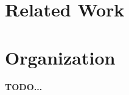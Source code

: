 \begin{comment}
A first application is mining. A miner is usually rewarded a fee after completing two tasks: verifying that the transactions in a new block are legitimate and completing a proof of work, usually in the form of finding a hash preimage of a string with a specific prefix. Other miners in turn invest computational resources verifying that these two tasks were accomplished correctly. This can be computationally intensive. If the checks miners usually carry out admitted non-interactive publicly verifiable rational proofs, they could simply verify those. This could lead  enormous savings in computational resources. Utility-maximizing blockchain users who are trying to arrive first mining a new block 
Some further observations are in place. The approach alone would not protect against malicious miners whose goal is to disrupt the network. It is unclear how the incentives of miners would change as a consequence. Incentives to accurate verification in the blockchain may benefit from this approach, as it may solve the \textit{verifier's dilemma}(\cite{luu2015demystifying}). The verifier's dilemma is the observation that miners have incentive to skip the verification of expensive transactions to gain a competitive advantage in the race for the next block. We leave more sophisticated security and game-theoretic analysis that would shed light on this as an open problem.



\subsection{Adversaries with Limited Parallel Time}






\section{Problem Statement}

\subsection{Rational Proofs: problem statement}

\subsection{Fine-Grained DoC: problem statement}

\end{comment}

\section{Related Work}


\section{Organization}
\textbf{TODO...}
